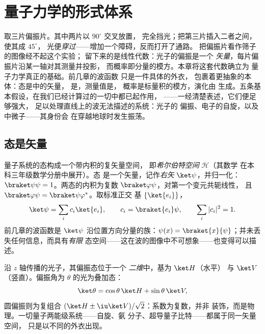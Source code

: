 \chapter{量子力学的形式体系}\label{ch:b3:quantum-formalism}

取三片偏振片。其中两片以 $90^\circ$ 交叉放置，
完全挡光；把第三片插入二者之间，使其成 $45^\circ$，
光便\emph{穿过}——增加一个障碍，反而打开了通路。
把偏振片看作筛子的图像经不起这个实验；
留下来的是线性代数：光子的偏振是一个
\emph{矢量}，每片偏振片沿某一轴对其测量并投影，
而概率即分量的模方。本章将这套代数确立为
量子力学真正的基础。前几章的波函数
只是一件具体的外衣，
包裹着更抽象的本体：态是中的矢量，
是，测量值是，
概率是标量积的模方，演化由
生成。五条基本假设，在我们已经计算过的一切中都已起作用，
——一经清楚表述，它们便足够强大，
足以处理直线上的波无法描述的系统：光子的
偏振、电子的自旋，以及中微子——其身份会
在穿越地球时发生振荡。

\section{态是矢量}

\begin{definition}\label{def:b3:quantum-formalism:state}
量子系统的态构成一个带内积的复矢量空间，
即\emph{希尔伯特空间} $\mathcal H$（其数学
在本科三年级数学分册中展开）。态
是一个矢量，记作\emph{右矢} $\ket\psi$，并归一化：
$\braket\psi\psi = 1$。两态的内积为复数
$\braket\varphi\psi$，对第一个变元共轭线性，
且 $\braket\varphi\psi = \braket\psi\varphi^*$。取标准正交
基 $\{\ket{e_i}\}$，
\[
\ket\psi = \sum_i c_i\ket{e_i} , \qquad
c_i = \braket{e_i}\psi , \qquad
\sum_i|c_i|^2 = 1 .
\]
前几章的波函数是
$\ket\psi$ 沿位置方向分量的族：$\psi(x) =
\braket{x}{\psi}$；并未丢失任何信息，而具有\emph{有限}
态空间——这在波的图像中不可想象——也变得可以描述。
\end{definition}

\begin{example}\label{ex:b3:quantum-formalism:polarization}
沿 $z$ 轴传播的光子，其偏振态位于一个
\emph{二维}中，基为 $\ket H$（水平）
与 $\ket V$（竖直）。偏振角为
$\theta$ 的光为叠加态：
\[
\ket\theta = \cos\theta\,\ket H + \sin\theta\,\ket V ,
\]
圆偏振则为复组合 $(\ket H \pm
\iu\ket V)/\sqrt2$：系数为复数，并非
装饰，而是物理。一切量子两能级系统——自旋、氨
分子、超导量子比特——都属于同一矢量空间，
只是以不同的外衣出现。
\end{example}

